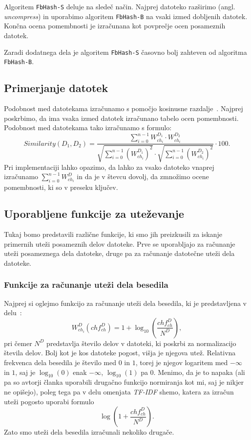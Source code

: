 \documentclass{acm_proc_article-sp}
\begin{document}
Algoritem \texttt{FbHash-S} deluje na sledeč način. Najprej datoteko razširimo (angl. \emph{uncompress}) in uporabimo algoritem \texttt{FbHash-B} na vsaki izmed dobljenih datotek. Končna ocena pomembnosti je izračunana kot povprečje ocen posameznih datotek.

Zaradi dodatnega dela je algoritem \texttt{FbHash-S} časovno bolj zahteven od algoritma \texttt{FbHash-B}.

\subsection{Primerjanje datotek}
\label{doc-compare}

Podobnost med datotekama izračunamo s pomočjo kosinusne razdalje~\cite{Salton88term-weightingapproaches}. Najprej poskrbimo, da ima vsaka izmed datotek izračunano tabelo ocen pomembnosti. Podobnost med datotekama tako izračunamo s formulo: \begin{displaymath} Similarity(D_1, D_2)=\frac{\sum_{i=0}^{n-1} W_{ch_i}^{D_1} \cdot W_{ch_i}^{D_2}}{\sqrt{\sum_{i=0}^{n-1} (W_{ch_i}^{D_1})^2}\cdot\sqrt{\sum_{i=0}^{n-1} (W_{ch_i}^{D_2})^2}}\cdot 100. \end{displaymath} Pri implementaciji lahko opazimo, da lahko za vsako datoteko vnaprej izračunamo $\sum_{i=0}^{n-1} W_{ch_i}^{D}$ in da je v števcu dovolj, da zmnožimo ocene pomembnosti, ki so v preseku ključev.

\subsection{Uporabljene funkcije za uteževanje}
\label{weight-functions}

Tukaj bomo predstavili različne funkcije, ki smo jih preizkusili za iskanje primernih uteži posameznih delov datoteke. Prve se uporabljajo za računanje uteži posameznega dela datoteke, druge pa za računanje datotečne uteži dela datoteke.

\subsubsection{Funkcije za računanje uteži dela besedila}\label{utezivclanku}
Najprej si oglejmo funkcijo za računanje uteži dela besedila, ki je predstavljena v delu~\cite{fbhash}:
\[ W_{ch_i}^{D}(ch f_{ch}^D) = 1 + \log_{10}\left(\frac{ch f_{ch}^D}{N^D}\right),\]
pri čemer $N^D$ predstavlja število delov v datoteki, ki poskrbi za normalizacijo števila delov. Bolj kot je kos datoteke pogost, višja je njegova utež. Relativna frekvenca dela besedila je število med $0$ in $1$, torej je njegov logaritem med $-\infty$ in $1$, saj je $\log_{10}(0)$ enak $-\infty$, $\log_{10}(1)$ pa 0. Menimo, da je to napaka (ali pa so avtorji članka uporabili drugačno funkcijo normiranja kot mi, saj je nikjer ne opišejo), poleg tega pa v delu omenjata \textit{TF-IDF} shemo, katera za izračun uteži pogosto uporabi formulo
\begin{displaymath}\log(1 + \frac{ch f_{ch}^D}{N^D}).\end{displaymath}
Zato smo uteži dela besedila izračunali nekoliko drugače.
\end{document}
